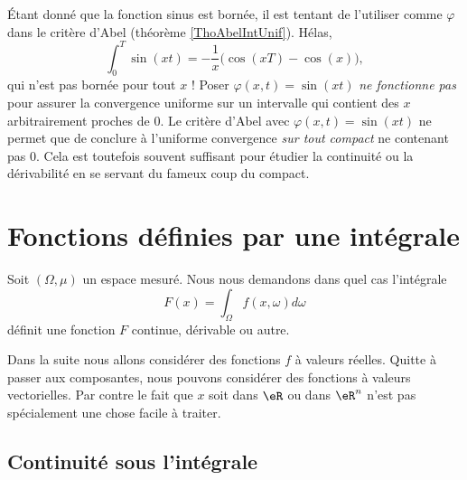 \begin{remark}
    Étant donné que la fonction sinus est bornée, il est tentant de l'utiliser comme $\varphi$ dans le critère d'Abel (théorème \ref{ThoAbelIntUnif}). Hélas,
    \begin{equation}
        \int_0^T\sin(xt)=-\frac{ 1 }{ x }\big( \cos(xT)-\cos(x) \big),
    \end{equation}
    qui n'est pas bornée pour tout $x$ ! Poser $\varphi(x,t)=\sin(xt)$ \emph{ne fonctionne pas} pour assurer la convergence uniforme sur un intervalle qui contient des $x$ arbitrairement proches de $0$. Le critère d'Abel avec $\varphi(x,t)=\sin(xt)$ ne permet que de conclure à l'uniforme convergence \emph{sur tout compact} ne contenant pas $0$. Cela est toutefois souvent suffisant pour étudier la continuité ou la dérivabilité en se servant du fameux coup du compact.
\end{remark}



\section{Fonctions définies par une intégrale}
\label{SecCHwnBDj}

Soit \( (\Omega,\mu)\) un espace mesuré. Nous nous demandons dans quel cas l'intégrale
\begin{equation}
    F(x)=\int_{\Omega}f(x,\omega)d\omega
\end{equation}
définit une fonction \( F\) continue, dérivable ou autre. 

Dans la suite nous allons considérer des fonctions \( f\) à valeurs réelles. Quitte à passer aux composantes, nous pouvons considérer des fonctions à valeurs vectorielles. Par contre le fait que \( x\) soit dans \( \eR\) ou dans \( \eR^n\) n'est pas spécialement une chose facile à traiter.

\subsection{Continuité sous l'intégrale}

